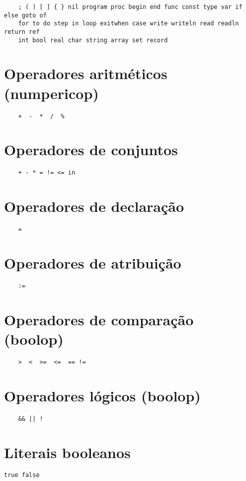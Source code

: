 \begin{verbatim}
    ; ( ) [ ] { } nil program proc begin end func const type var if else goto of
    for to do step in loop exitwhen case write writeln read readln return ref
    int bool real char string array set record
\end{verbatim}
\section{Operadores aritméticos (numpericop)}
\begin{verbatim}
    +  -  *  /  % 
\end{verbatim}

\section{Operadores de conjuntos}
\begin{verbatim}
    + - * = != <= in
\end{verbatim}

\section{Operadores de declaração}
\begin{verbatim}
    =
\end{verbatim}

\section{Operadores de atribuição}
\begin{verbatim}
    :=
\end{verbatim}

\section{Operadores de comparação (boolop)}
\begin{verbatim}
    >  <  >=  <=  == !=
\end{verbatim}

\section{Operadores lógicos (boolop)}
\begin{verbatim}
    && || !
\end{verbatim}

\section{Literais booleanos}
\begin{Verbatim}[commandchars=\\\{\}]
    true false
\end{Verbatim}